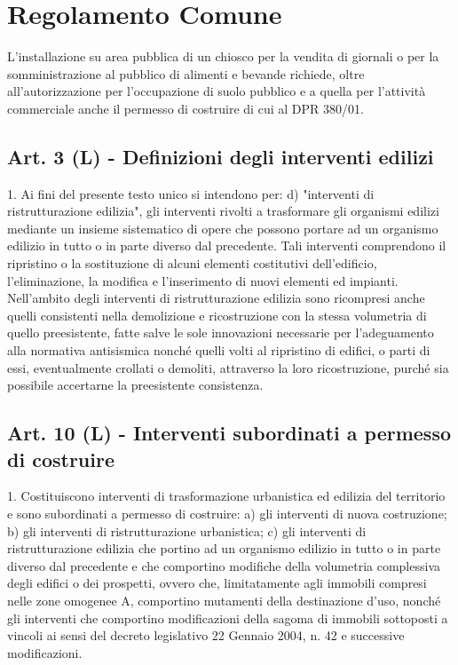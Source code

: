 \section{Regolamento Comune}

L’installazione su area pubblica di un chiosco per la vendita di giornali o per la somministrazione al pubblico di alimenti e bevande richiede, oltre all’autorizzazione per l’occupazione di suolo pubblico e a quella per l’attività commerciale anche il permesso di costruire di cui al DPR 380/01.


\subsection{Art. 3 (L) - Definizioni degli interventi edilizi}

1. Ai fini del presente testo unico si intendono per:
d) "interventi di ristrutturazione edilizia", gli interventi rivolti a trasformare gli organismi edilizi mediante un insieme sistematico di opere che possono portare ad un organismo edilizio in tutto o in parte diverso dal precedente. Tali interventi comprendono il ripristino o la sostituzione di alcuni elementi costitutivi dell'edificio, l’eliminazione, la modifica e l'inserimento di nuovi elementi ed impianti. Nell'ambito degli interventi di ristrutturazione edilizia sono ricompresi anche quelli consistenti nella demolizione e ricostruzione con la stessa volumetria di quello preesistente, fatte salve le sole innovazioni necessarie per l'adeguamento alla normativa antisismica nonché quelli volti al ripristino di edifici, o parti di essi, eventualmente crollati o demoliti, attraverso la loro ricostruzione, purché sia possibile accertarne la preesistente consistenza. 

\subsection{Art. 10 (L) - Interventi subordinati a permesso di costruire}

1. Costituiscono interventi di trasformazione urbanistica ed edilizia del territorio e sono subordinati a permesso di costruire:
a) gli interventi di nuova costruzione;
b) gli interventi di ristrutturazione urbanistica;
c) gli interventi di ristrutturazione edilizia che portino ad un organismo edilizio in tutto o in parte diverso dal precedente e che comportino modifiche della volumetria complessiva degli edifici o dei prospetti, ovvero che, limitatamente agli immobili compresi nelle zone omogenee A, comportino mutamenti della destinazione d’uso, nonché gli interventi che comportino modificazioni della sagoma di immobili sottoposti a vincoli ai sensi del decreto legislativo 22 Gennaio 2004, n. 42 e successive modificazioni.